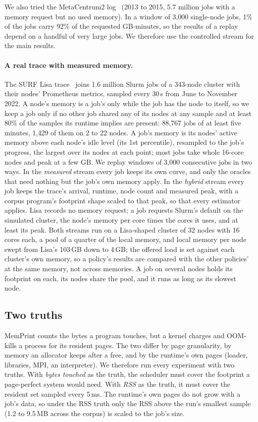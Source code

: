\documentclass[11pt]{article}
\newcommand{\memprint}{MemPrint}
\newcommand{\term}[1]{\emph{#1}}
\begin{document}
We also tried the MetaCentrum2 log~\cite{PWA} (2013 to 2015, 5.7 million jobs with a memory request but no
used memory). In a window of 3{,}000 single-node jobs, 1\% of the jobs carry 92\% of the requested GB-minutes,
so the results of a replay depend on a handful of very large jobs. We therefore use the controlled stream for
the main results.

\paragraph{A real trace with measured memory.} The SURF Lisa trace~\cite{LisaTrace} joins 1.6 million Slurm jobs
of a 343-node cluster with their nodes' Prometheus metrics, sampled every 30\,s from June to November 2022. A
node's memory is a job's only while the job has the node to itself, so we keep a job only if no other job shared
any of its nodes at any sample and at least 80\% of the samples its runtime implies are present: 88{,}767 jobs of
at least five minutes, 1{,}429 of them on 2 to 22 nodes. A job's memory is its nodes' active memory above each
node's idle level (its 1st percentile), resampled to the job's progress, the largest over its nodes at each
point; most jobs take whole 16-core nodes and peak at a few GB. We replay windows of 3{,}000 consecutive jobs
in two ways. In the \term{measured} stream every job keeps its own curve, and only the oracles that need nothing
but the job's own memory apply. In the \term{hybrid} stream every job keeps the trace's arrival, runtime, node
count and measured peak, with a corpus program's footprint shape scaled to that peak, so that every estimator
applies. Lisa records no memory request; a job requests Slurm's default on the simulated cluster, the node's
memory per core times the cores it uses, and at least its peak. Both streams run on a Lisa-shaped cluster of 32
nodes with 16 cores each, a pool of a quarter of the local memory, and local memory per node swept from Lisa's
103\,GB down to 4\,GB; the offered load is set against each cluster's own memory, so a policy's results are
compared with the other policies' at the same memory, not across memories. A job on several nodes holds its
footprint on each, its nodes share the pool, and it runs as long as its slowest node.

\subsection{Two truths}
\label{sec:truths}

\memprint{} counts the bytes a program touches, but a kernel charges and OOM-kills a process for its resident
pages. The two differ by page granularity, by memory an allocator keeps after a free, and by the runtime's own
pages (loader, libraries, MPI, an interpreter). We therefore run every experiment with two truths. With
\term{bytes touched} as the truth, the scheduler must cover the footprint a page-perfect system would need.
With \term{RSS} as the truth, it must cover the resident set sampled every 5\,ms. The runtime's own pages do
not grow with a job's data, so under the RSS truth only the RSS above the run's smallest sample (1.2 to 9.5\,MB
across the corpus) is scaled to the job's size.
\end{document}

